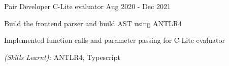 

\begin{cventries}



  \cventry
    {Pair Developer} %
    {C-Lite evaluator} %
    {} %
    {Aug 2020 - Dec 2021} %
    {
      \begin{cvitems} %
        \item {Build the frontend parser and build AST using ANTLR4}
        \item {Implemented function calls and parameter passing for C-Lite evaluator}
        \item {\textit{(Skills Learnt):} ANTLR4, Typescript}
      \end{cvitems}
    }




\end{cventries}
